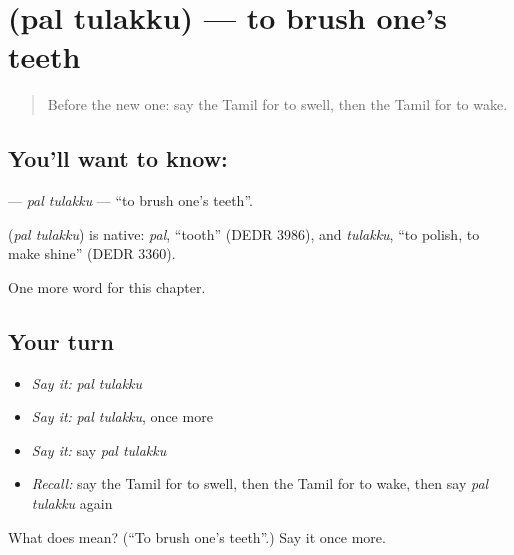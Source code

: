 \section[\texorpdfstring{\ta{பல்} \ta{துலக்கு} (pal tulakku)}{பல் துலக்கு (pal tulakku)}]{  (pal tulakku) — to brush one's teeth}

\label{lesson:TA-C255-pal-tulakku}



\begin{quote}
Before the new one: say the Tamil for to swell, then the Tamil for to wake.
\end{quote}

\subsection*{You'll want to know:  }
\textbf{ } — \emph{pal tulakku} — \textquotedblleft{}to brush one's teeth\textquotedblright{}.

\begin{cousinweb}
\textbf{ } (\emph{pal tulakku}) is native: \emph{pal}, \textquotedblleft{}tooth\textquotedblright{} (DEDR 3986), and \emph{tulakku}, \textquotedblleft{}to polish, to make shine\textquotedblright{} (DEDR 3360).
\end{cousinweb}

\begin{grammarlens}[title={What you've built}]
One more word for this chapter.
\end{grammarlens}

\subsection*{Your turn}
\begin{itemize}
\raggedright
  \item \emph{Say it:} \emph{pal tulakku}
  \item \emph{Say it:} \emph{pal tulakku}, once more
  \item \emph{Say it:} say \emph{pal tulakku}
  \item \emph{Recall:} say the Tamil for to swell, then the Tamil for to wake, then say \emph{pal tulakku} again
\end{itemize}

\begin{tcolorbox}[breakable,colback=teal!4,colframe=teal!35!black,title={Before you move on}]
What does   mean? (\textquotedblleft{}To brush one's teeth\textquotedblright{}.) Say it once more.
\end{tcolorbox}

